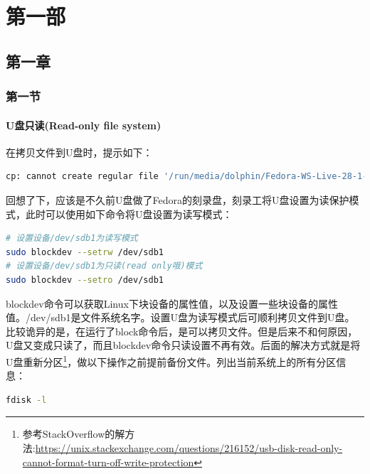 \documentclass{book}
\begin{document}

\clearpage

\clearpage
\mbox{}         
\clearpage
	
\tableofcontents	

\part{第一部}


\chapter{第一章}

\section{第一节}

\subsection{U盘只读(Read-only file system)}

在拷贝文件到U盘时，提示如下：

\begin{lstlisting}[language=Bash]
cp: cannot create regular file '/run/media/dolphin/Fedora-WS-Live-28-1-1/note': Read-only file system
\end{lstlisting}

回想了下，应该是不久前U盘做了Fedora的刻录盘，刻录工将U盘设置为读保护模式，此时可以使用如下命令将U盘设置为读写模式：

\begin{lstlisting}[language=Bash]
# 设置设备/dev/sdb1为读写模式
sudo blockdev --setrw /dev/sdb1
# 设置设备/dev/sdb1为只读(read only哦)模式
sudo blockdev --setro /dev/sdb1
\end{lstlisting}

blockdev命令可以获取Linux下块设备的属性值，以及设置一些块设备的属性值。/dev/sdb1是文件系统名字。设置U盘为读写模式后可顺利拷贝文件到U盘。比较诡异的是，在运行了block命令后，是可以拷贝文件。但是后来不和何原因，U盘又变成只读了，而且blockdev命令只读设置不再有效。后面的解决方式就是将U盘重新分区\footnote{参考StackOverflow的解方法:\url{https://unix.stackexchange.com/questions/216152/usb-disk-read-only-cannot-format-turn-off-write-protection}}，做以下操作之前提前备份文件。列出当前系统上的所有分区信息：

\begin{lstlisting}[language=Bash]
fdisk -l
\end{lstlisting}
\end{document}
